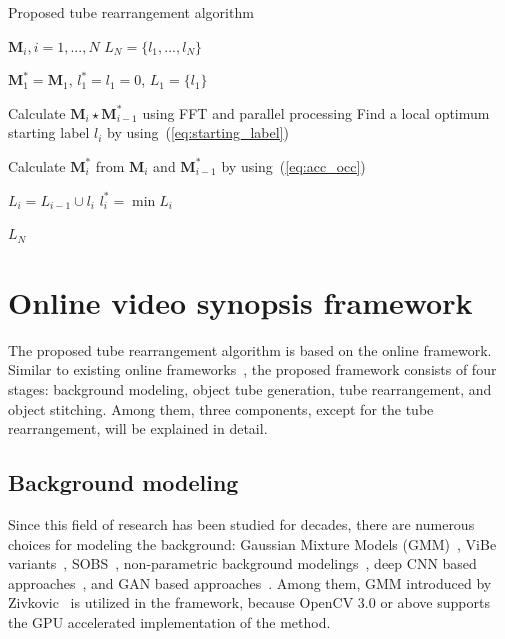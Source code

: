 \documentclass[11pt]{hyu_thesis}
\begin{document}
\begin{algorithm}[t]
	\caption{Proposed tube rearrangement algorithm}
	\label{alg:proposed}
	\begin{algorithmic}
		\REQUIRE $\textbf{M}_{i}, i = 1,...,N$
		\ENSURE $L_{N} = \{ l_{1},...,l_{N} \}$
		
		\STATE $\textbf{M}_{1}^{*} = \textbf{M}_{1}$, $l_{1}^{*} = l_{1} = 0$, $L_{1} = \{ l_{1} \}$
		
		\STATE Calculate $\textbf{M}_{i} \star \textbf{M}_{i-1}^{*}$ using FFT and parallel processing
		\STATE Find a local optimum starting label $l_{i}$ by using~(\ref{eq:starting_label})

		\STATE Calculate $\textbf{M}_{i}^{*}$ from $\textbf{M}_{i}$ and $\textbf{M}_{i-1}^{*}$ by using~(\ref{eq:acc_occ})

		\STATE $L_{i} = L_{i-1} \cup l_{i}$
		\STATE $l_{i}^{*} = \min L_{i}$
		\ENDFOR
		
		\RETURN $L_{N}$
	\end{algorithmic}
\end{algorithm}
\chapter{Online video synopsis framework}
\label{sec:framework}
The proposed tube rearrangement algorithm is based on the online framework. Similar to existing online frameworks~\cite{Fu2014,Zhu2015,He2017}, the proposed framework consists of four stages: background modeling, object tube generation, tube rearrangement, and object stitching. Among them, three components, except for the tube rearrangement, will be explained in detail.

\section{Background modeling}
Since this field of research has been studied for decades, there are numerous choices for modeling the background: Gaussian Mixture Models (GMM)~\cite{Zivkovic2004,Zivkovic2006}, ViBe variants~\cite{Barnich2009ViBe,Barnich2011ViBe,VanDroogenbroeck2012Background,VanDroogenbroeck2014ViBe}, SOBS~\cite{maddalena2008self,maddalena2012sobs}, non-parametric background modelings~\cite{Hofmann2012,Muchtar2018}, deep CNN based approaches~\cite{Patil2018,Lim2018}, and GAN based approaches~\cite{Bakkay2018,Sultana2019,Sakkos2019}. Among them, GMM introduced by Zivkovic~\cite{Zivkovic2004} is utilized in the framework, because OpenCV 3.0 or above supports the GPU accelerated implementation of the method.
\end{document}
